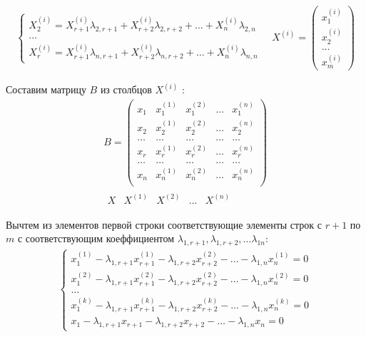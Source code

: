 \begin{answer}
\begin{gather*}
\begin{cases}
      X_2^{(i)} = X_{r+1}^{(i)} \lambda_{2,r+1} + X_{r+2}^{(i)} \lambda_{2,r+2} + \ldots + X_{n}^{(i)} \lambda_{2, n} \\
      \ldots \\
      X_r^{(i)} = X_{r+1}^{(i)} \lambda_{n,r+1} + X_{r+2}^{(i)} \lambda_{n,r+2} + \ldots + X_{n}^{(i)} \lambda_{n, n} \tag{5}
    \end{cases} \quad 
    X^{(i)} = 
    \begin{pmatrix}
      x_1^{(i)} \\ x_2^{(i)} \\ \ldots \\ x_m^{(i)}
    \end{pmatrix}
  \end{gather*}

  Составим матрицу $B$ из столбцов $X^{(i)}$ :
  \begin{align*}
    B =
    \begin{pmatrix}
      x_1 & x_1^{(1)} & x_1^{(2)} & \ldots & x_1^{(n)} \\
      x_2 & x_2^{(1)} & x_2^{(2)} & \ldots & x_2^{(n)} \\
      \ldots & \ldots & \ldots & \ldots & \ldots \\
      x_r & x_r^{(1)} & x_r^{(2)} & \ldots & x_r^{(n)} \\
      \ldots & \ldots & \ldots & \ldots & \ldots \\
      x_n & x_n^{(1)} & x_n^{(2)} & \ldots & x_n^{(n)} \\
    \end{pmatrix} \\
    \begin{matrix}
      X & X^{(1)} & X^{(2)} & \ldots & X^{(n)}
    \end{matrix}
  \end{align*} 

  Вычтем из элементов первой строки соответствующие элементы строк с $r+1$ по $m$ с соответствующим коеффициентом  $\lambda_{1,r+1}, \lambda_{1,r+2}, \ldots \lambda_{1n}$:
  \begin{gather*}
    \begin{cases}
      x_1^{(1)} - \lambda_{1,r+1} x_{r+1}^{(1)} - \lambda_{1,r+2} x_{r+2}^{(2)} - \ldots - \lambda_{1,n} x_{n}^{(1)} = 0 \\
      x_1^{(2)} - \lambda_{1,r+1} x_{r+1}^{(2)} - \lambda_{1,r+2} x_{r+2}^{(2)} - \ldots - \lambda_{1,n} x_{n}^{(2)} = 0 \\
      \ldots \\
      x_1^{(k)} - \lambda_{1,r+1} x_{r+1}^{(k)} - \lambda_{1,r+2} x_{r+2}^{(k)} - \ldots - \lambda_{1,n} x_{n}^{(k)} = 0 \\
      x_1 - \lambda_{1,r+1} x_{r+1} - \lambda_{1,r+2} x_{r+2} - \ldots - \lambda_{1,n} x_{n} = 0
    \end{cases}
  \end{gather*}


\end{answer}
